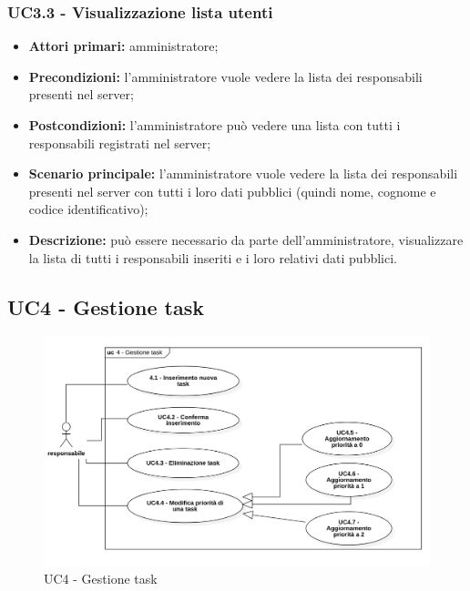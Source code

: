 \subsubsection{UC3.3 - Visualizzazione lista utenti}

\begin{itemize}
	\item 	\textbf{Attori primari:} amministratore;
	\item 	\textbf{Precondizioni:} l'amministratore vuole vedere la lista dei responsabili presenti nel server;
	\item 	\textbf{Postcondizioni:} l'amministratore può vedere una lista con tutti i responsabili registrati nel server;
	\item 	\textbf{Scenario principale:} l'amministratore vuole vedere la lista dei responsabili presenti nel server con tutti i loro dati pubblici (quindi nome, cognome e codice identificativo);
	\item 	\textbf{Descrizione:} può essere necessario da parte dell'amministratore, visualizzare la lista di tutti i responsabili inseriti e i loro relativi dati pubblici.
\end{itemize}

\subsection{UC4 - Gestione task}

\begin{figure}[H]
	\centering
	\includegraphics[scale=0.52]{res/images/uc4.png}
	\caption{UC4 - Gestione task}
\end{figure}

